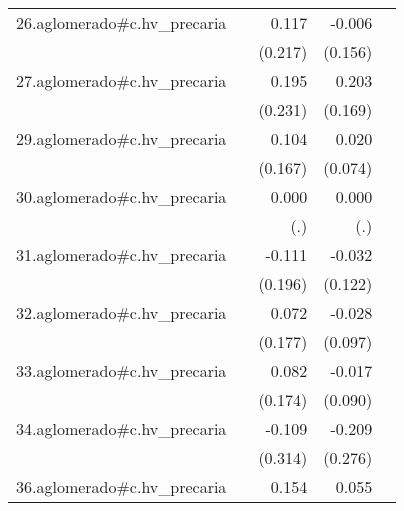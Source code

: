 {\begin{longtable}{l*{4}{D{.}{.}{-1}}}
\addlinespace
26.aglomerado#c.hv\_precaria&                     &       0.117         &      -0.006         &                     \\
            &                     &     (0.217)         &     (0.156)         &                     \\
\addlinespace
27.aglomerado#c.hv\_precaria&                     &       0.195         &       0.203         &                     \\
            &                     &     (0.231)         &     (0.169)         &                     \\
\addlinespace
29.aglomerado#c.hv\_precaria&                     &       0.104         &       0.020         &                     \\
            &                     &     (0.167)         &     (0.074)         &                     \\
\addlinespace
30.aglomerado#c.hv\_precaria&                     &       0.000         &       0.000         &                     \\
            &                     &         (.)         &         (.)         &                     \\
\addlinespace
31.aglomerado#c.hv\_precaria&                     &      -0.111         &      -0.032         &                     \\
            &                     &     (0.196)         &     (0.122)         &                     \\
\addlinespace
32.aglomerado#c.hv\_precaria&                     &       0.072         &      -0.028         &                     \\
            &                     &     (0.177)         &     (0.097)         &                     \\
\addlinespace
33.aglomerado#c.hv\_precaria&                     &       0.082         &      -0.017         &                     \\
            &                     &     (0.174)         &     (0.090)         &                     \\
\addlinespace
34.aglomerado#c.hv\_precaria&                     &      -0.109         &      -0.209         &                     \\
            &                     &     (0.314)         &     (0.276)         &                     \\
\addlinespace
36.aglomerado#c.hv\_precaria&                     &       0.154         &       0.055         &                     \\

\end{longtable}}
